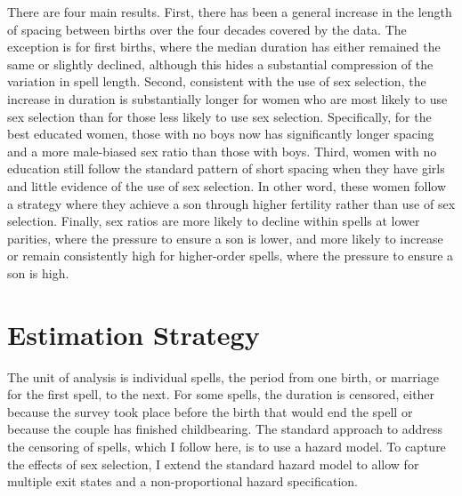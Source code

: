 \documentclass[12pt,letterpaper]{article}
\begin{document}
There are four main results.
First, there has been a general increase in the length of spacing between births
over the four decades covered by the data.
The exception is for first births, where the median duration has either remained
the same or slightly declined, although this hides a substantial compression of
the variation in spell length.
Second, consistent with the use of sex selection, the increase in duration is 
substantially longer for women who are most likely to use sex selection than
for those less likely to use sex selection.
Specifically, for the best educated women, those with no boys now has 
significantly longer spacing and a more male-biased sex ratio than those 
with boys.
Third, women with no education still follow the standard pattern of short 
spacing when they have girls and little evidence of the use of sex selection.
In other word, these women follow a strategy where they achieve a son through
higher fertility rather than use of sex selection.
Finally, sex ratios are more likely to decline within spells at lower parities, 
where the pressure to ensure a son is lower, and more likely to increase or 
remain consistently high for higher-order spells, where the pressure to ensure 
a son is high.




\section{Estimation Strategy\label{sec:strategy}}


The unit of analysis is individual spells, the period from one birth, or marriage for
the first spell, to the next.
For some spells, the duration is censored, either because the survey
took place before the birth that would end the spell or because the couple
has finished childbearing.
The standard approach to address the censoring of spells, which I follow here, is 
to use a hazard model.
To capture the effects of sex selection, I extend the standard hazard model 
to allow for multiple exit states and a non-proportional hazard specification.
\end{document}
